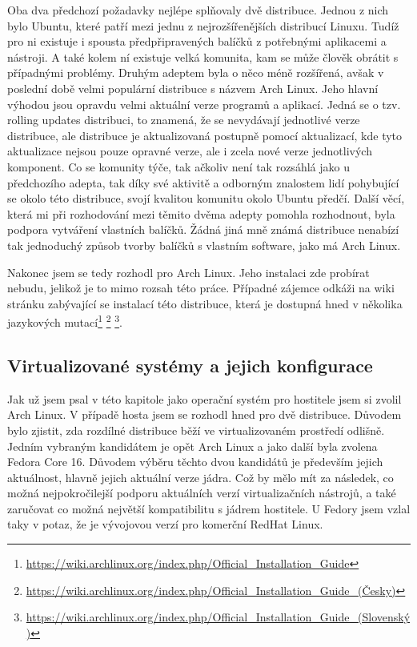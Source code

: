 Oba dva předchozí požadavky nejlépe splňovaly dvě distribuce. Jednou z nich bylo Ubuntu, které patří mezi jednu z nejrozšířenějších distribucí Linuxu. Tudíž pro ni existuje i spousta předpřipravených balíčků z potřebnými aplikacemi a nástroji. A také kolem ní existuje velká komunita, kam se může člověk obrátit s případnými problémy. Druhým adeptem byla o něco méně rozšířená, avšak v poslední době velmi populární distribuce s názvem Arch Linux. Jeho hlavní výhodou jsou opravdu velmi aktuální verze programů a aplikací. Jedná se o tzv. rolling updates distribuci, to znamená, že se nevydávají jednotlivé verze distribuce, ale distribuce je aktualizovaná postupně pomocí aktualizací, kde tyto aktualizace nejsou pouze opravné verze, ale i zcela nové verze jednotlivých komponent. Co se komunity týče, tak ačkoliv není tak rozsáhlá jako u předchozího adepta, tak díky své aktivitě a odborným znalostem lidí pohybující se okolo této distribuce, svojí kvalitou komunitu okolo Ubuntu předčí. Další věcí, která mi při rozhodování mezi těmito dvěma adepty pomohla rozhodnout, byla podpora vytváření vlastních balíčků. Žádná jiná mně známá distribuce nenabízí tak jednoduchý způsob tvorby balíčků s vlastním software, jako má Arch Linux.

Nakonec jsem se tedy rozhodl pro Arch Linux. Jeho instalaci zde probírat nebudu, jelikož je to mimo rozsah této práce. Případné zájemce odkáži na wiki stránku zabývající se instalací této distribuce, která je dostupná hned v několika jazykových mutací\footnote{\url{https://wiki.archlinux.org/index.php/Official\_Installation\_Guide}}
\footnote{\url{https://wiki.archlinux.org/index.php/Official\_Installation\_Guide\_(Česky)}}
\footnote{\url{https://wiki.archlinux.org/index.php/Official\_Installation\_Guide\_(Slovenský)}}.

\subsection{Virtualizované systémy a jejich konfigurace}
Jak už jsem psal v této kapitole jako operační systém pro hostitele jsem si zvolil Arch Linux. V případě hosta jsem se rozhodl hned pro dvě distribuce. Důvodem bylo zjistit, zda rozdílné distribuce běží ve virtualizovaném prostředí odlišně. Jedním vybraným kandidátem je opět Arch Linux a jako další byla zvolena Fedora Core 16. Důvodem výběru těchto dvou kandidátů je především jejich aktuálnost, hlavně jejich aktuální verze jádra. Což by mělo mít za následek, co možná nejpokročilejší podporu aktuálních verzí virtualizačních nástrojů, a také zaručovat co možná největší kompatibilitu s jádrem hostitele. U Fedory jsem vzlal taky v potaz, že je vývojovou verzí pro komerční RedHat Linux.

